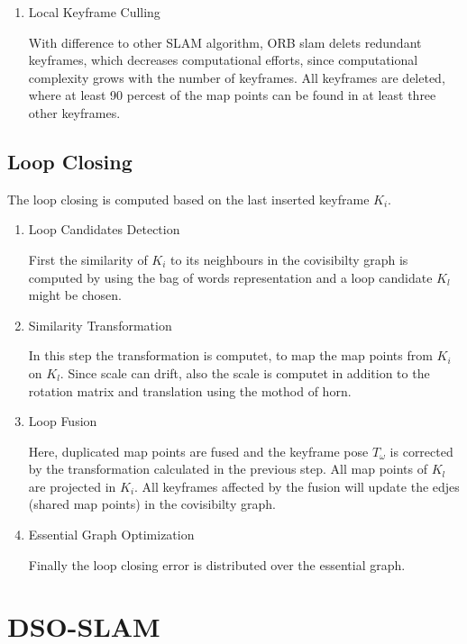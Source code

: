 \begin{enumerate}
	\item{Local Keyframe Culling}
	
	With difference to other SLAM algorithm, ORB slam delets redundant 
	keyframes, which decreases computational efforts, since computational
	complexity grows with the number of keyframes. All keyframes are deleted, 
	where at least 90 percest of the map points can be found in at least three other 
	keyframes. 
	
	
	\end{enumerate}
	
	\subsection{Loop Closing}
	
	The loop closing is computed based on the last inserted keyframe $K_i$. 
	
	\begin{enumerate}
	\item{Loop Candidates Detection}
	
	First the similarity of $K_i$ to its neighbours in the covisibilty
	graph is computed by using the bag of words representation and a 
	loop candidate $K_l$ might be chosen. 
	
	\item{Similarity Transformation}
	
	In this step the transformation is computet, to map the map points
	from $K_i$ on $K_l$. Since scale can drift, also the scale is computet
	in addition to the rotation matrix and translation using the mothod of horn. 
	
	
	\item{Loop Fusion}
	
	Here, duplicated map points are fused and the keyframe pose $T_\omega$ is corrected by the transformation
	calculated in the previous step. All map points of $K_l$ are projected in $K_i$. 
	All keyframes affected by the fusion will update the edjes (shared map points) in the 
	covisibilty graph. 
	
	\item{ Essential Graph Optimization}
	
	Finally the loop closing error is distributed over the essential graph. 
	
	
	\end{enumerate}

	\section{DSO-SLAM}
	
